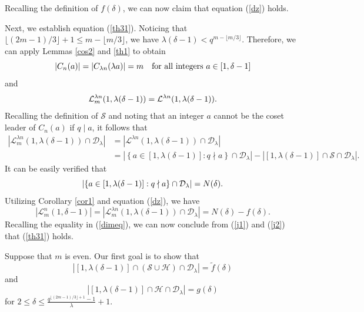 \documentclass[journal,onecolumn]{IEEEtran}
\begin{document}
Recalling the definition of $f(\delta)$, we can now claim that equation (\ref{dz}) holds. 



Next, we establish equation (\ref{th31}). 
Noticing that
$\lfloor ({2m-1})/{3}\rfloor+1\leq m-\lfloor {m}/{3}\rfloor$, we have $\lambda(\delta-1)< q^{m-\lfloor {m}/{3}\rfloor}$. Therefore, we can apply     Lemmas \ref{cos2} and  \ref{th1}  to obtain 
\begin{equation}\label{j1}
    |C_{n}(a)|= |C_{\lambda n}(\lambda a)|=m  \quad \hbox{for all integers }a\in [1,\delta-1]
\end{equation}
and 
\begin{equation}\notag
     \mathcal{L}_m^{\lambda n}(1,\lambda(\delta-1))= \mathcal{L}^{\lambda n}(1,\lambda(\delta-1)).
\end{equation}
Recalling the definition of $\mathcal{S}$ and noting  that an integer $a$ cannot be the  coset leader of $C_n(a)$ if  $q\mid a$, it follows that 
\begin{align*}
 \left| \mathcal{L}_m^{\lambda n}(1,\lambda(\delta-1))\cap \mathcal{D}_{\lambda}\right| &= \left|\mathcal{L}^{\lambda n}(1,\lambda(\delta-1))\cap \mathcal{D}_{\lambda}\right|\\
 & =
  \left| \left\{a\in [1,\lambda(\delta-1)]: q\nmid a \right \} \cap \mathcal{D}_{\lambda}\right| - \left|\left [1,\lambda(\delta-1)\right]\cap\mathcal{S}\cap \mathcal{D}_{\lambda}\right|.
\end{align*}
It  can be easily verified that 
\begin{equation}\notag
  \left|   \left\{a\in [1,\lambda(\delta-1)]: q\nmid a \right \} \cap \mathcal{D}_{\lambda} \right| =N(\delta).
\end{equation}
Utilizing Corollary \ref{cor1}
and equation  (\ref{dz}), we have 
 \begin{equation}\label{j2}
   \left|\mathcal{L}_m^{n}(1,\delta-1)\right| =  \left |   \mathcal{L}_m^{\lambda n}(1,\lambda(\delta-1))\cap \mathcal{D}_{\lambda} \right| = N(\delta)-f(\delta).
\end{equation}
Recalling the equality in (\ref{dimeq}), we can now conclude from (\ref{j1}) and  (\ref{j2}) that (\ref{th31})  holds. 

Suppose that  $m$ is even. Our first goal is to show that \begin{equation}\label{even1}
    \left|\left[1,\lambda(\delta-1)\right] \cap(\mathcal{S}\cup \mathcal{H})\cap \mathcal{D}_{\lambda}  \right|=\widetilde{f}(\delta)
\end{equation}
and 
\begin{equation}\label{even2}
       \left|\left[1,\lambda(\delta-1)\right] \cap \mathcal{H} \cap \mathcal{D}_{\lambda}  \right|=g(\delta)
\end{equation} for $2\leq \delta\leq  \frac{q^{\lfloor (2m-1)/3\rfloor+1}-1}{\lambda}+1.$
\end{document}
